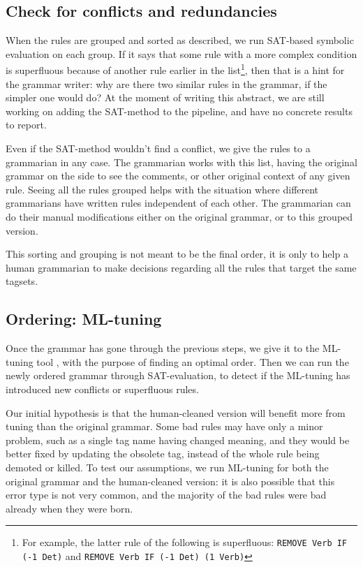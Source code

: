 \documentclass[11pt]{article}
\begin{document}
\subsection{Check for conflicts and redundancies}

When the rules are grouped and sorted as described, we run SAT-based 
symbolic evaluation \cite{listenmaa_claessen2016} on each group. 
If it says that some rule with a more complex condition is superfluous 
because of another rule earlier in the list\footnote{For example, the latter rule of the following is superfluous: \texttt{REMOVE Verb IF (-1 Det)} and \texttt{REMOVE Verb IF (-1 Det) (1 Verb)}}, 
then that is a hint for the grammar writer: why are there two similar 
rules in the grammar, if the simpler one would do?
At the moment of writing this abstract, we are still working on adding
the SAT-method to the pipeline, and have no concrete results to report.

Even if the SAT-method wouldn't find a conflict, we give the rules to 
a grammarian in any case. The grammarian works with this list, having 
the original grammar on the side to see the comments, or other original 
context of any given rule. Seeing all the rules grouped helps with the 
situation where different grammarians have written rules independent of 
each other. The grammarian can do their manual modifications either on 
the original grammar, or to this grouped version.

This sorting and grouping is not meant to be the final order, it is only 
to help a human grammarian to make decisions regarding all the rules that 
target the same tagsets.

\subsection{Ordering: ML-tuning}
Once the grammar has gone through the previous steps, we give it to the 
ML-tuning tool \cite{bick2013tuning}, with the purpose of finding an 
optimal order. Then we can run the newly ordered grammar through SAT-evaluation,
to detect if the ML-tuning has introduced new conflicts or superfluous rules.

Our initial hypothesis is that the human-cleaned version will benefit more 
from tuning than the original grammar. Some bad rules may have only a minor 
problem, such as a single tag name having changed meaning, and they would be 
better fixed by updating the obsolete tag, instead of the whole rule being 
demoted or killed. 
To test our assumptions, we run ML-tuning for both the original grammar and 
the human-cleaned version: it is also possible that this error type is not very 
common, and the majority of the bad rules were bad already when they were born.
\end{document}
